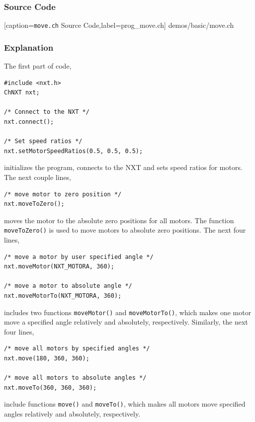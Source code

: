\documentclass[11pt]{article}
\begin{document}
\subsubsection*{Source Code}

    [caption={{\tt move.ch} Source Code},label=prog_move.ch]
    {demos/basic/move.ch}

\subsubsection*{Explanation}
The first part of code,
\begin{lstlisting}
#include <nxt.h>
ChNXT nxt;

/* Connect to the NXT */
nxt.connect();

/* Set speed ratios */
nxt.setMotorSpeedRatios(0.5, 0.5, 0.5);
\end{lstlisting}
initializes the program, connects to the NXT and sets speed ratios for motors. 
The next couple lines,
\begin{lstlisting}
/* move motor to zero position */
nxt.moveToZero();
\end{lstlisting}
moves the motor to the absolute zero positions for all motors. The function 
{\tt moveToZero()} is used to move motors to absolute zero positions. The next 
four lines,

\begin{lstlisting}
/* move a motor by user specified angle */
nxt.moveMotor(NXT_MOTORA, 360);

/* move a motor to absolute angle */
nxt.moveMotorTo(NXT_MOTORA, 360);
\end{lstlisting}
includes two functions {\tt moveMotor()} and {\tt moveMotorTo()}, which makes 
one motor move a specified angle relatively and absolutely, respectively. 
Similarly, the next four lines,
\begin{lstlisting}
/* move all motors by specified angles */
nxt.move(180, 360, 360);

/* move all motors to absolute angles */
nxt.moveTo(360, 360, 360);
\end{lstlisting}
include functions {\tt move()} and {\tt moveTo()}, which makes all motors 
move specified angles relatively and absolutely, respectively.

\end{document}
